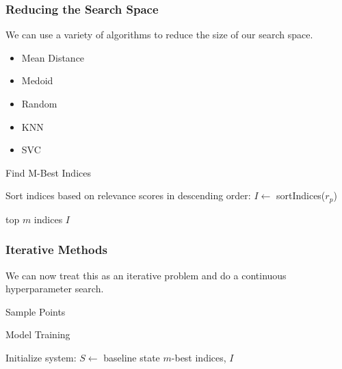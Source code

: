 \documentclass[sigconf]{acmart}
\begin{document}
\subsubsection{Reducing the Search Space}
We can use a variety of algorithms to reduce the size of our search space. 
\begin{itemize}
    \item Mean Distance
    \item Medoid
    \item Random
    \item KNN
    \item SVC
\end{itemize}


\begin{algorithm}
  \caption{Find M-Best Indices}
  
  
  
  Sort indices based on relevance scores in descending order: $I \gets$ sortIndices($r_p$)\;
  
  \Return top $m$ indices $I$\;
\end{algorithm}



\subsubsection{Iterative Methods}
We can now treat this as an iterative problem and do a continuous hyperparameter search.


\begin{algorithm}
    \caption{Sample Points}
\end{algorithm}

\begin{algorithm}
  \caption{Model Training}
  
  
  Initialize system: $S \gets$ baseline state\;
  \Return $m$-best indices, $I$\;
\end{algorithm}
\end{document}
